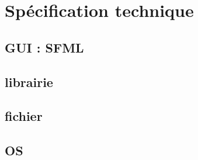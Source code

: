 \section{Spécification technique}

\subsection{GUI : SFML}

\subsection{librairie}

\subsection{fichier}

\subsection{OS}
